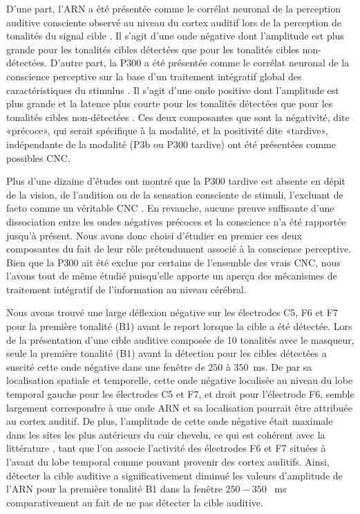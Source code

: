 D'une part, l'ARN a été présentée comme le corrélat neuronal de la perception auditive consciente observé au niveau du cortex auditif lors de la perception de tonalités du signal cible \citep{gutschalk2008neural, eklund2019auditory, konigs2012functional, gartner2021auditory, wiegand2012correlates}. 
Il s'agit d'une onde négative dont l'amplitude est plus grande pour les tonalités cibles détectées que pour les tonalités cibles non-détectées. 
D'autre part, la P300 a été présentée comme le corrélat neuronal de la conscience perceptive sur la base d'un traitement intégratif global des caractéristiques du stimulus \citep{dehaene2006conscious, del2007brain, sergent2004neural, sergent2005timing}. 
Il s'agit d'une onde positive dont l'amplitude est plus grande et la latence plus courte pour les tonalités détectées que pour les tonalités cibles non-détectées \citep{dykstra2016neural, giani2015detecting, parasuraman1980brain, paul1972evoked, squires1973vertex}. 
Ces deux composantes que sont la négativité, dite «précoce», qui serait spécifique à la modalité, et la positivité dite «tardive», indépendante de la modalité (P3b ou P300 tardive) ont été présentées comme possibles CNC. 

Plus d'une dizaine d'études ont montré que la P300 tardive est absente en dépit de la vision, de l'audition ou de la sensation consciente de stimuli, l'excluant de facto comme un véritable CNC \citep{dembski2021physiological}. 
En revanche, aucune preuve suffisante d'une dissociation entre les ondes négatives précoces et la conscience n'a été rapportée jusqu'à présent. 
Nous avons donc choisi d'étudier en premier ces deux composantes du fait de leur rôle prétendument associé à la conscience perceptive. 
Bien que la P300 ait été exclue par certains de l'ensemble des vrais CNC, nous l'avons tout de même étudié puisqu'elle apporte un aperçu des mécanismes de traitement intégratif de l'information au niveau cérébral. 

Nous avons trouvé une large déflexion négative sur les électrodes C5, F6 et F7 pour la première tonalité (B1) avant le report lorsque la cible a été détectée. 
Lors de la présentation d'une cible auditive composée de 10 tonalités avec le masqueur, seule la première tonalité (B1) avant la détection pour les cibles détectées a suscité cette onde négative dans une fenêtre de $250$ à $350$~ms. 
De par sa localisation spatiale et temporelle, cette onde négative localisée au niveau du lobe temporal gauche pour les électrodes C5 et F7, et droit pour l'électrode F6, semble largement correspondre à une onde ARN et sa localisation pourrait être attribuée au cortex auditif. 
De plus, l'amplitude de cette onde négative était maximale dans les sites les plus antérieurs du cuir chevelu, ce qui est cohérent avec la littérature \citep{eklund2019auditory}, tant que l'on associe l'activité des électrodes F6 et F7 situées à l'avant du lobe temporal comme pouvant provenir des cortex auditifs. 
Ainsi, détecter la cible auditive a significativement diminué les valeurs d'amplitude de l'ARN pour la première tonalité B1 dans la fenêtre $250-350$~ ms comparativement au fait de ne pas détecter la cible auditive. 

